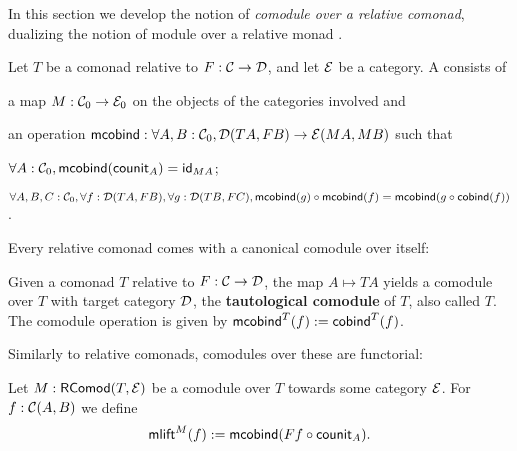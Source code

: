 \documentclass[envcountsame]{llncs}
\begin{document}
In this section we develop the notion of \emph{comodule over a relative comonad}, dualizing the notion of module over a relative monad \parencite{ahrens_relmonads}.

\begin{definition}%
\label{def:comodule}
 Let $T$ be a comonad relative to $F:\C\to\D$, and let $\E$ be a category.
 A  consists of
   \begin{packitem}
   \item a map $M:\C_0 \to \E_0$ on the objects of the categories involved and
   \item an operation $\mcobind: \forall A,B:\C_0, \D(TA,FB) \to \E(MA,MB)$ such that
   \item $\forall A : \C_0, \mcobind(\counit_A) = \id_{MA}$;
   \item $\forall A,B,C:\C_0, \forall f : \D(TA,FB),\forall g:\D(TB,FC), \\
        \comp{\mcobind(f)}{\mcobind(g)} = \mcobind(\comp{\cobind(f)}{g})$ .
  \end{packitem}

\end{definition}




Every relative comonad comes with a canonical comodule over itself:

\begin{definition}%
\label{def:tautological_comodule}
  Given a comonad $T$ relative to $F:\C\to\D$, the map $A \mapsto TA$ yields a comodule over $T$ 
  with target category $\D$, the \textbf{tautological comodule} of $T$, also called $T$.
  The comodule operation is given by
    $  \mcobind^T(f) := \cobind^T(f)$. 
\end{definition}




\begin{Long}
Similarly to relative comonads, comodules over these are functorial:
\begin{definition}%
\label{def:comodule_lift}
 Let $M : \RComod(T,\E)$ be a comodule over $T$ towards some category $\E$. For $f : \C(A,B)$ we define
  \[ \mlift^M(f) := \mcobind(\comp{\counit_A}{Ff}) .  \]
\end{definition}
\end{Long}
\end{document}
